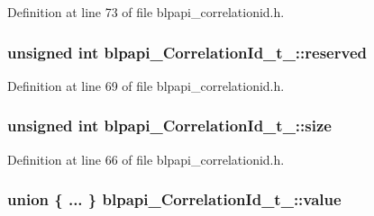 Definition at line 73 of file blpapi\+\_\+correlationid.\+h.

\subsubsection[{\texorpdfstring{reserved}{reserved}}]{\setlength{\rightskip}{0pt plus 5cm}unsigned int blpapi\+\_\+\+Correlation\+Id\+\_\+t\+\_\+\+::reserved}\hypertarget{structblpapi___correlation_id__t___a45f729e0cacecfdf391abf228a261e2a}{}\label{structblpapi___correlation_id__t___a45f729e0cacecfdf391abf228a261e2a}


Definition at line 69 of file blpapi\+\_\+correlationid.\+h.

\subsubsection[{\texorpdfstring{size}{size}}]{\setlength{\rightskip}{0pt plus 5cm}unsigned int blpapi\+\_\+\+Correlation\+Id\+\_\+t\+\_\+\+::size}\hypertarget{structblpapi___correlation_id__t___abef27e4a792faf00f4306d93788d0051}{}\label{structblpapi___correlation_id__t___abef27e4a792faf00f4306d93788d0051}


Definition at line 66 of file blpapi\+\_\+correlationid.\+h.

\subsubsection[{\texorpdfstring{value}{value}}]{\setlength{\rightskip}{0pt plus 5cm}union \{ ... \}   blpapi\+\_\+\+Correlation\+Id\+\_\+t\+\_\+\+::value}\hypertarget{structblpapi___correlation_id__t___aede39fa56134d13faf86f52b10798e98}{}\label{structblpapi___correlation_id__t___aede39fa56134d13faf86f52b10798e98}

